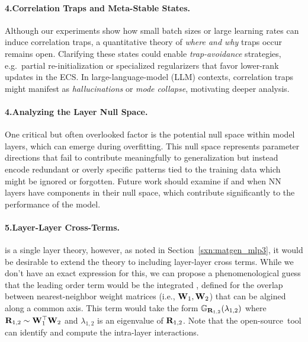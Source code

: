 \paragraph{4.\quad Correlation Traps and Meta-Stable States.}
Although our experiments show how small batch sizes or large learning rates can induce correlation traps, 
a quantitative theory of \emph{where and why} traps occur remains open. Clarifying these states could 
enable \emph{trap-avoidance} strategies, e.g.\ partial re-initialization or specialized regularizers that 
favor lower-rank updates in the ECS. In large-language-model (LLM) contexts, correlation traps might 
manifest as \emph{hallucinations} or \emph{mode collapse}, motivating deeper analysis.

\paragraph{4.\quad Analyzing the Layer Null Space.}
One critical but often overlooked factor is the potential null space within model layers, which can emerge during overfitting. This null space represents parameter directions that fail to contribute meaningfully to generalization but instead encode redundant or overly specific patterns tied to the training data which might be ignored or forgotten.
Future work should examine if and when NN layers have components in their null space,
which contribute significantly to the performance of the model.

\paragraph{5.\quad Layer-Layer Cross-Terms.}
\SETOL is a single layer theory, however, as noted in Section~\ref{sxn:matgen_mlp3}, it would 
be desirable to extend the theory to including layer-layer cross terms.
While we don't have an exact expression for this, we can propose a phenomenological guess
that the leading order term would be the integrated \RTransform,
defined for the overlap between nearest-neighbor weight matrices
(i.e., ${\mathbf{W}}_{1},{\mathbf{W}}_{2}$) that can be algined along a common axis.
This term would take the form $\mathbb{G}_{\mathbf{R}_{1,2}}(\lambda_{1,2})$
where $\mathbf{R}_{1,2}\sim{\mathbf{W}}_{1}^{\top}{\mathbf{W}}_{2}$ and $\lambda_{1,2}$ is an
eigenvalue of $\mathbf{R}_{1,2}$.  Note that the open-source~\WW tool can
identify and compute the intra-layer interactions.\cite{WW}




